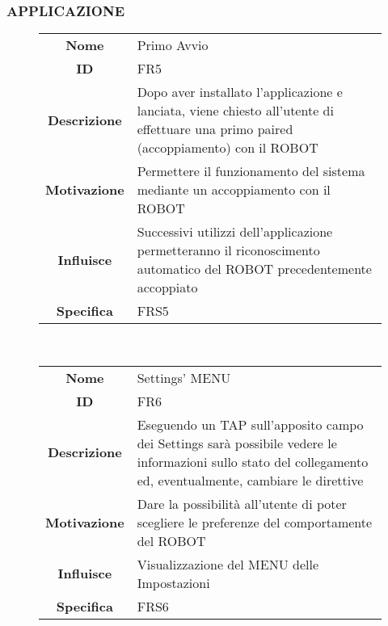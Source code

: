 \documentclass[]{article}
\begin{document}
\hypertarget{applicazione}{%
\subsubsection{APPLICAZIONE}\label{applicazione}}

\begin{figure}[htbp]
\centering
\begin{tabular}{|c|l|}
\hline

\textbf{Nome}
 & 
Primo Avvio
\\

\textbf{ID}
 & 
FR5
\\

\textbf{Descrizione}
 & 
Dopo aver installato l'applicazione e lanciata, viene chiesto all'utente
di effettuare una primo paired (accoppiamento) con il ROBOT
\\

\textbf{Motivazione}
 & 
Permettere il funzionamento del sistema mediante un accoppiamento con il
ROBOT
\\

\textbf{Influisce}
 & 
Successivi utilizzi dell'applicazione permetteranno il riconoscimento
automatico del ROBOT precedentemente accoppiato
\\

\textbf{Specifica}
 & 
FRS5
\\
\hline
\end{tabular}
\end{figure}

~

\begin{figure}[htbp]
\centering
\begin{tabular}{|c|l|}
\hline

\textbf{Nome}
 & 
Settings' MENU
\\

\textbf{ID}
 & 
FR6
\\

\textbf{Descrizione}
 & 
Eseguendo un TAP sull'apposito campo dei Settings sarà possibile vedere
le informazioni sullo stato del collegamento ed, eventualmente, cambiare
le direttive
\\

\textbf{Motivazione}
 & 
Dare la possibilità all'utente di poter scegliere le preferenze del
comportamente del ROBOT
\\

\textbf{Influisce}
 & 
Visualizzazione del MENU delle Impostazioni
\\

\textbf{Specifica}
 & 
FRS6
\\
\hline
\end{tabular}
\end{figure}
\end{document}
